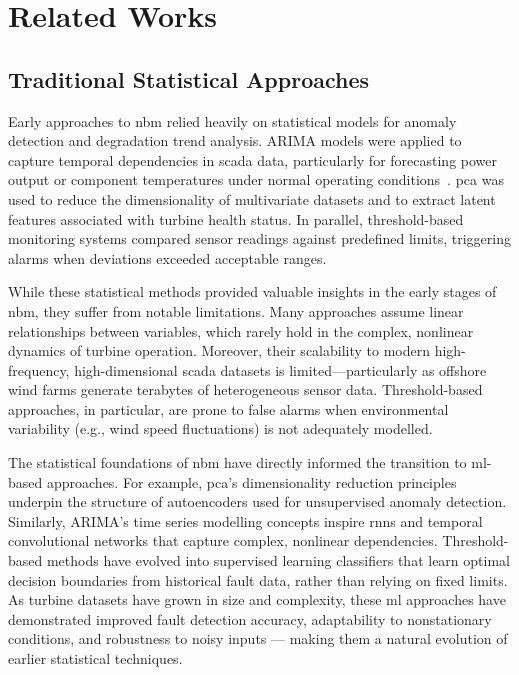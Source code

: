 
\chapter{Related Works}
\label{ch:related-works}

\ifpdf
    \graphicspath{{2_related_works/figures/PNG/}{2_related_works/figures/PDF/}{2_related_works/figures/}}
\else
    \graphicspath{{2_related_works/figures/EPS/}{2_related_works/figures/}}
\fi


\section{Traditional Statistical Approaches}
\label{sec:traditional-statistical-approaches}
Early approaches to \gls{nbm} relied heavily on statistical models for anomaly detection and degradation trend analysis.
ARIMA models were applied to capture temporal dependencies in \gls{scada} data, particularly for forecasting power output or component temperatures under normal operating conditions~\citep{chesterman_overview_2023}.
\gls{pca} was used to reduce the dimensionality of multivariate datasets and to extract latent features associated with turbine health status.
In parallel, threshold-based monitoring systems compared sensor readings against predefined limits, triggering alarms when deviations exceeded acceptable ranges.

While these statistical methods provided valuable insights in the early stages of \gls{nbm}, they suffer from notable limitations.
Many approaches assume linear relationships between variables, which rarely hold in the complex, nonlinear dynamics of turbine operation.
Moreover, their scalability to modern high-frequency, high-dimensional \gls{scada} datasets is limited—particularly as offshore wind farms generate terabytes of heterogeneous sensor data.
Threshold-based approaches, in particular, are prone to false alarms when environmental variability (e.g., wind speed fluctuations) is not adequately modelled.


The statistical foundations of \gls{nbm} have directly informed the transition to \gls{ml}-based approaches.
For example, \gls{pca}'s dimensionality reduction principles underpin the structure of autoencoders used for unsupervised anomaly detection.
Similarly, ARIMA's time series modelling concepts inspire \glspl{rnn} and temporal convolutional networks that capture complex, nonlinear dependencies.
Threshold-based methods have evolved into supervised learning classifiers that learn optimal decision boundaries from historical fault data, rather than relying on fixed limits.
As turbine datasets have grown in size and complexity, these \gls{ml} approaches have demonstrated improved fault detection accuracy, adaptability to nonstationary conditions, and robustness to noisy inputs — making them a natural evolution of earlier statistical techniques.


